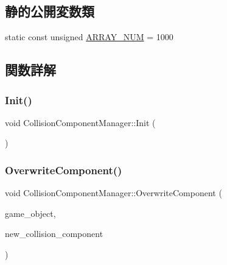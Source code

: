 \subsection*{静的公開変数類}
\begin{DoxyCompactItemize}
\item 
static const unsigned \mbox{\hyperlink{class_collision_component_manager_a44b557bb46f56b06522367ca142db710}{A\+R\+R\+A\+Y\+\_\+\+N\+UM}} = 1000
\end{DoxyCompactItemize}


\subsection{関数詳解}
\mbox{\label{class_collision_component_manager_ad3cdee51a184eaf784629d2f77e61887}} 
\subsubsection{\texorpdfstring{Init()}{Init()}}
{\footnotesize\ttfamily void Collision\+Component\+Manager\+::\+Init (\begin{DoxyParamCaption}{ }\end{DoxyParamCaption})\hspace{0.3cm}{\ttfamily [static]}}

\mbox{\label{class_collision_component_manager_a728423faf3bacb0808f2d08411b12503}} 
\subsubsection{\texorpdfstring{Overwrite\+Component()}{OverwriteComponent()}}
{\footnotesize\ttfamily void Collision\+Component\+Manager\+::\+Overwrite\+Component (\begin{DoxyParamCaption}\item[{\mbox{\hyperlink{class_game_object_origin}{Game\+Object\+Origin}} $\ast$}]{game\+\_\+object,  }\item[{\mbox{\hyperlink{class_collision_component}{Collision\+Component}} $\ast$}]{new\+\_\+collision\+\_\+component }\end{DoxyParamCaption})\hspace{0.3cm}{\ttfamily [static]}}

